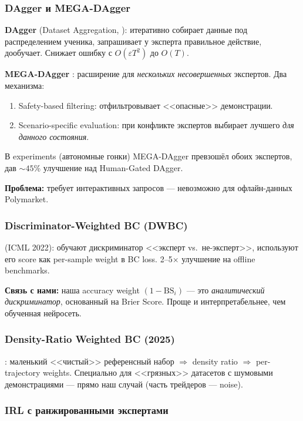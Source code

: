 \documentclass[a4paper, 11pt]{article}
\newcommand{\bs}{\mathrm{BS}}
\begin{document}
\subsubsection{DAgger и MEGA-DAgger}

\textbf{DAgger} (Dataset Aggregation, \citealt{ross2011reduction}):
итеративно собирает данные под распределением ученика,
запрашивает у эксперта правильное действие, дообучает.
Снижает ошибку с $O(\varepsilon T^2)$ до $O(T)$.

\textbf{MEGA-DAgger} \citep{sun2023mega}:
расширение для \emph{нескольких несовершенных} экспертов.
Два механизма:
\begin{enumerate}[nosep]
  \item Safety-based filtering: отфильтровывает <<опасные>> демонстрации.
  \item Scenario-specific evaluation: при конфликте экспертов выбирает
    лучшего \emph{для данного состояния}.
\end{enumerate}

В experiments (автономные гонки) MEGA-DAgger превзошёл обоих экспертов,
дав ${\sim}45$\% улучшение над Human-Gated DAgger.

\textbf{Проблема:} требует интерактивных запросов --- невозможно для офлайн-данных Polymarket.

\subsubsection{Discriminator-Weighted BC (DWBC)}

\citet{xu2022dwbc} (ICML 2022): обучают дискриминатор <<эксперт vs.\ не-эксперт>>,
используют его score как per-sample weight в BC loss.
2--5$\times$ улучшение на offline benchmarks.

\textbf{Связь с нами:} наша accuracy weight $(1 - \bs_i)$ ---
это \emph{аналитический дискриминатор}, основанный на Brier Score.
Проще и интерпретабельнее, чем обученная нейросеть.

\subsubsection{Density-Ratio Weighted BC (2025)}

\citet{densityratio2025}: маленький <<чистый>> референсный набор
$\Rightarrow$ density ratio $\Rightarrow$ per-trajectory weights.
Специально для <<грязных>> датасетов с шумовыми демонстрациями ---
прямо наш случай (часть трейдеров --- noise).

\subsubsection{IRL с ранжированными экспертами}
\end{document}

